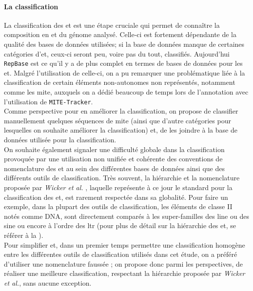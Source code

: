 \documentclass[10pt]{article}
\begin{document}
\paragraph{La classification} La classification des \acrlong{et} est une étape cruciale qui permet de connaître la composition en \acrshort{et} du génome analysé. Celle-ci est fortement dépendante de la qualité des bases de données utilisées; si la base de données manque de certaines catégories d'\acrshort{et}, ceux-ci seront peu, voire pas du tout, classifiés. Aujourd'hui \texttt{RepBase} est ce qu'il y a de plus complet en termes de bases de données pour les \acrlong{et}. Malgré l'utilisation de celle-ci, on a pu remarquer une problématique liée à la classification de certain éléments non-autonomes non représentés, notamment comme les \acrshort{mite}, auxquels on a dédié beaucoup de temps lors de l'annotation avec l'utilisation de \texttt{MITE-Tracker}. \\
Comme perspective pour en améliorer la classification, on propose de classifier manuellement quelques séquences de \acrshort{mite} (ainsi que d'autre catégories pour lesquelles on souhaite améliorer la classification) et, de les joindre à la base de données utilisée pour la classification. \\

On souhaite également signaler une difficulté globale dans la classification provoquée par une utilisation non unifiée et cohérente des conventions de nomenclature des \acrshort{et}  au sein des différentes bases de données ainsi que des différents outils de classification. Très souvent, la hiérarchie et la nomenclature proposée par \textit{Wicker et al.} \cite{wicker}, laquelle représente à ce jour le standard pour la classification des \acrshort{et}, est rarement respectée dans sa globalité. Pour faire un exemple, dans la plupart des outils de classification, les éléments de classe II notés comme DNA, sont directement comparés à les super-familles des \acrshort{line} ou des \acrshort{sine} ou encore à l'ordre des \acrshort{ltr} (pour plus de détail sur la hiérarchie des \acrshort{et}, se référer à la \figureautorefname{ \ref{fig:classif_et}}). \\
Pour simplifier et, dans un premier temps permettre une classification homogène entre les différentes outils de classification utilisés dans cet étude, on a préféré d'utiliser une nomenclature \og faussée \fg{}; on propose donc parmi les perspectives, de réaliser une meilleure classification, respectant la hiérarchie proposée par \textit{Wicker et al.}, sans aucune exception. \\
\end{document}
